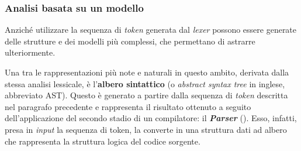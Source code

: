 \subsubsection{Analisi basata su un modello}
Anziché utilizzare la sequenza di \textit{token} generata dal \textit{lexer} possono essere generate delle strutture e dei modelli più complessi, che permettano di astrarre ulteriormente.

Una tra le rappresentazioni più note e naturali in questo ambito, derivata dalla stessa analisi lessicale, è l'\textbf{albero sintattico} (o \textit{abstract syntax tree} in inglese, abbreviato AST).
%
Questo è generato a partire dalla sequenza di \textit{token} descritta nel paragrafo precedente e rappresenta il risultato ottenuto a seguito dell'applicazione del secondo stadio di un compilatore: il \textbf{\textit{Parser}} ().
%
Esso, infatti, presa in \textit{input} la sequenza di token, la converte in una struttura dati ad albero che rappresenta la struttura logica del codice sorgente.

